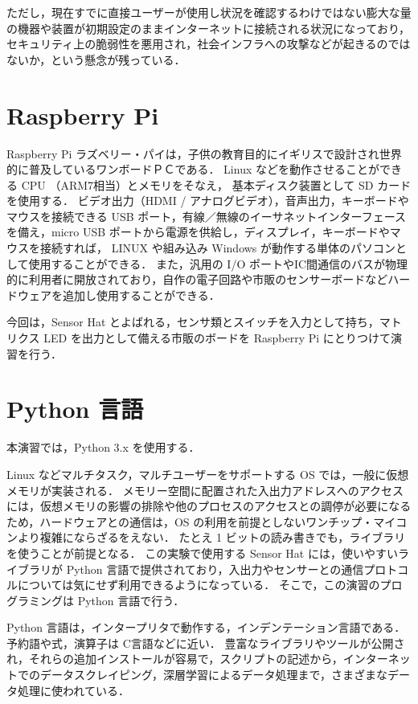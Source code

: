 \documentclass[11pt,a4,epsf]{report}
\begin{document}
ただし，現在すでに直接ユーザーが使用し状況を確認するわけではない膨大な量の機器や装置が初期設定のままインターネットに接続される状況になっており，
セキュリティ上の脆弱性を悪用され，社会インフラへの攻撃などが起きるのではないか，という懸念が残っている．

\section{Raspberry Pi}

Raspberry Pi ラズベリー・パイは，子供の教育目的にイギリスで設計され世界的に普及しているワンボードＰＣである．
Linux などを動作させることができる CPU （ARM7相当）とメモリをそなえ， 基本ディスク装置として SD カードを使用する．
ビデオ出力（HDMI / アナログビデオ），音声出力，キーボードやマウスを接続できる USB ポート，有線／無線のイーサネットインターフェースを備え，micro USB ポートから電源を供給し，ディスプレイ，キーボードやマウスを接続すれば，
LINUX や組み込み Windows が動作する単体のパソコンとして使用することができる．
また，汎用の I/O ポートやIC間通信のバスが物理的に利用者に開放されており，自作の電子回路や市販のセンサーボードなどハードウェアを追加し使用することができる．

今回は，Sensor Hat  とよばれる，センサ類とスイッチを入力として持ち，マトリクス LED を出力として備える市販のボードを Raspberry Pi にとりつけて演習を行う．


\section{Python 言語}

本演習では，Python 3.x を使用する．

Linux などマルチタスク，マルチユーザーをサポートする OS では，一般に仮想メモリが実装される．
メモリー空間に配置された入出力アドレスへのアクセスには，仮想メモリの影響の排除や他のプロセスのアクセスとの調停が必要になるため，ハードウェアとの通信は，OS の利用を前提としないワンチップ・マイコンより複雑にならざるをえない．
たとえ 1 ビットの読み書きでも，ライブラリを使うことが前提となる．
この実験で使用する Sensor Hat には，使いやすいライブラリが Python 言語で提供されており，入出力やセンサーとの通信プロトコルについては気にせず利用できるようになっている．
そこで，この演習のプログラミングは Python 言語で行う．

Python 言語は，インタープリタで動作する，インデンテーション言語である．
予約語や式，演算子は C言語などに近い．
豊富なライブラリやツールが公開され，それらの追加インストールが容易で，スクリプトの記述から，インターネットでのデータスクレイピング，深層学習によるデータ処理まで，さまざまなデータ処理に使われている．
\end{document}
